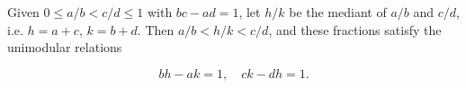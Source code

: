 Given $0 \leq a/b < c/d \leq 1$ with $bc - ad = 1$, let $h/k$ be the mediant of $a/b$ and $c/d$, i.e. $h = a + c$, $k = b + d$. Then $a/b < h/k < c/d$, and these fractions satisfy the unimodular relations

$$bh - ak = 1, \quad ck - dh = 1.$$
